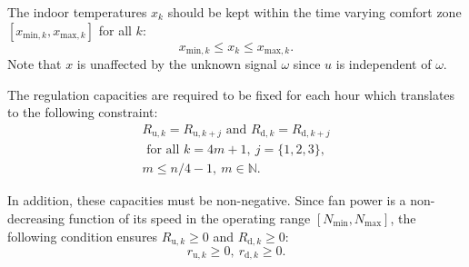 The indoor temperatures $x_k$ should be kept within the time varying comfort zone $[x_{\text{min},k}, x_{\text{max},k}]$ for all $k$:
\begin{equation}
x_{\text{min},k} \leq x_{k} \leq x_{\text{max},k}.
\end{equation}
Note that $x$ is unaffected by the unknown signal $\omega$ since $u$ is independent of $\omega$.



The regulation capacities are required to be fixed for each hour which translates to the following constraint:
\begin{multline}\label{eq:R_constraint_const}
R_{\text{u},k} = R_{\text{u},k+j} \text{~and~} R_{\text{d},k} = R_{\text{d},k+j}\\
\text{~for all~} k = 4m+1,~ j = \{1,2,3\}, \\
m \leq n/4-1, ~m \in \mathbb{N}.
\end{multline}

\noindent In addition, these capacities must be non-negative. Since fan power is a non-decreasing function of its speed in the operating range $[N_\text{min}, N_\text{max}]$, the following condition ensures $R_{\text{u},k} \geq 0$ and $R_{\text{d},k} \geq 0$:
\begin{equation}\label{eq:r_constraint} 
r_{\text{u},k} \geq 0, ~r_{\text{d},k} \geq 0.
\end{equation}


